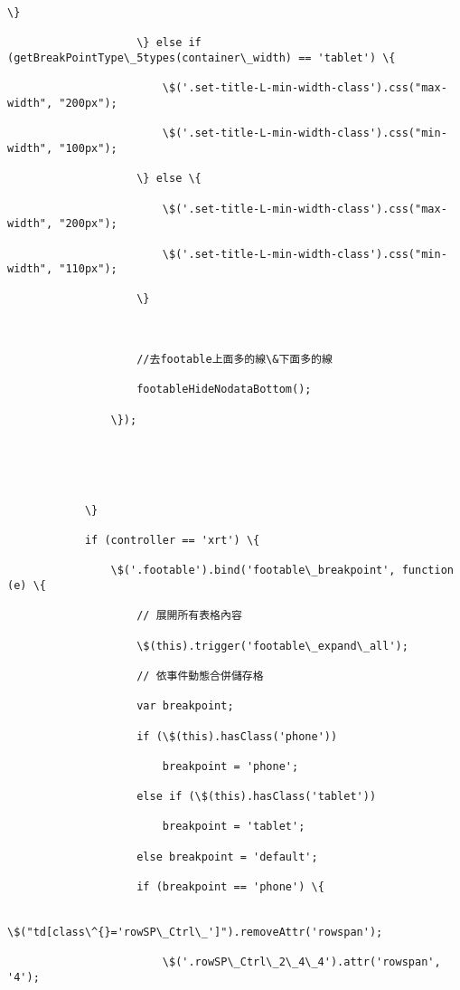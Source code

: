 \documentclass[11pt]{article}
\begin{document}
\begin{Verbatim}[commandchars=\\\{\}]
                        \}

                    \} else if (getBreakPointType\_5types(container\_width) == 'tablet') \{

                        \$('.set-title-L-min-width-class').css("max-width", "200px");

                        \$('.set-title-L-min-width-class').css("min-width", "100px");

                    \} else \{

                        \$('.set-title-L-min-width-class').css("max-width", "200px");

                        \$('.set-title-L-min-width-class').css("min-width", "110px");

                    \}



                    //去footable上面多的線\&下面多的線

                    footableHideNodataBottom();

                \});





            \}

            if (controller == 'xrt') \{

                \$('.footable').bind('footable\_breakpoint', function (e) \{

                    // 展開所有表格內容

                    \$(this).trigger('footable\_expand\_all');

                    // 依事件動態合併儲存格

                    var breakpoint;

                    if (\$(this).hasClass('phone'))

                        breakpoint = 'phone';

                    else if (\$(this).hasClass('tablet'))

                        breakpoint = 'tablet';

                    else breakpoint = 'default';

                    if (breakpoint == 'phone') \{

                        \$("td[class\^{}='rowSP\_Ctrl\_']").removeAttr('rowspan');

                        \$('.rowSP\_Ctrl\_2\_4\_4').attr('rowspan', '4');


\end{Verbatim}
\end{document}
